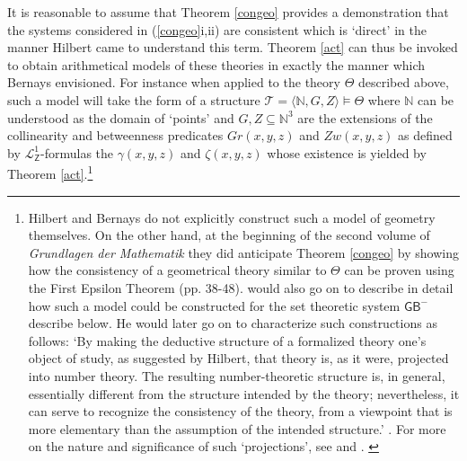\documentclass[11pt,fleqn,leqno]{article}
\begin{document}
It is reasonable to assume that Theorem \ref{congeo} provides a demonstration that the systems considered in (\ref{congeo}i,ii) are consistent which is `direct' in the manner Hilbert came to understand this term.   Theorem \ref{act} can thus be invoked to obtain arithmetical models of these theories in exactly the manner which Bernays envisioned.  For instance when applied to the theory $\Theta$ described above, such a model will take the form of a structure $\mathcal{T} = \langle \mathbb{N},G,Z\rangle \models \Theta$ where $\mathbb{N}$ can be understood as the domain of `points' and $G,Z \subseteq \mathbb{N}^3$ are the extensions of the collinearity and betweenness predicates $Gr(x,y,z)$ and $Zw(x,y,z)$ as defined by $\mathcal{L}^1_{\mathsf{Z}}$-formulas the $\gamma(x,y,z)$ and $\zeta(x,y,z)$ whose existence is yielded by Theorem \ref{act}.\footnote{Hilbert and Bernays do not explicitly construct such a model of geometry themselves.   On the other hand, at the beginning of the second volume of \textsl{Grundlagen der Mathematik} they did anticipate Theorem \ref{congeo} by showing how the consistency of a geometrical theory similar to $\Theta$ can be proven using the First Epsilon Theorem (pp. 38-48).  \citet[pp. 88-94]{Bernays1954} would also go on to describe in detail how such a model could be constructed for the set theoretic system $\mathsf{GB}^-$ describe below.   He would later go on to characterize such constructions as follows: `By making the deductive structure of a formalized theory one's object of study, as suggested by Hilbert, that theory is, as it were, projected into number theory. The resulting number-theoretic structure is, in general, essentially different from the structure intended by the theory; nevertheless, it can serve to recognize the consistency of the theory, from a viewpoint that is more elementary than the assumption of the intended structure.'  \citeyearpar[p. 63]{Bernays1970}. For more on the nature and significance of such `projections', see \citep{Dean2017c} and \citep[\S 3]{Sieg2020}. \label{proj}}
\end{document}
